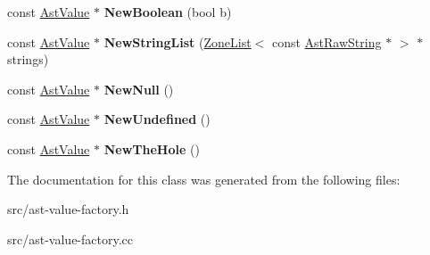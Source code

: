 \begin{DoxyCompactItemize}
\item 
\hypertarget{classv8_1_1internal_1_1_ast_value_factory_ae03a5d1347d22306588b0e5709ccfc82}{}const \hyperlink{classv8_1_1internal_1_1_ast_value}{Ast\+Value} $\ast$ {\bfseries New\+Boolean} (bool b)\label{classv8_1_1internal_1_1_ast_value_factory_ae03a5d1347d22306588b0e5709ccfc82}

\item 
\hypertarget{classv8_1_1internal_1_1_ast_value_factory_a7bee5a9a03b03f59d2a6c62ab52045ed}{}const \hyperlink{classv8_1_1internal_1_1_ast_value}{Ast\+Value} $\ast$ {\bfseries New\+String\+List} (\hyperlink{classv8_1_1internal_1_1_zone_list}{Zone\+List}$<$ const \hyperlink{classv8_1_1internal_1_1_ast_raw_string}{Ast\+Raw\+String} $\ast$ $>$ $\ast$strings)\label{classv8_1_1internal_1_1_ast_value_factory_a7bee5a9a03b03f59d2a6c62ab52045ed}

\item 
\hypertarget{classv8_1_1internal_1_1_ast_value_factory_a93026a40389b24fda775956f218248b8}{}const \hyperlink{classv8_1_1internal_1_1_ast_value}{Ast\+Value} $\ast$ {\bfseries New\+Null} ()\label{classv8_1_1internal_1_1_ast_value_factory_a93026a40389b24fda775956f218248b8}

\item 
\hypertarget{classv8_1_1internal_1_1_ast_value_factory_a8822771d32f8a55049f7698cc936b495}{}const \hyperlink{classv8_1_1internal_1_1_ast_value}{Ast\+Value} $\ast$ {\bfseries New\+Undefined} ()\label{classv8_1_1internal_1_1_ast_value_factory_a8822771d32f8a55049f7698cc936b495}

\item 
\hypertarget{classv8_1_1internal_1_1_ast_value_factory_acb9d0ab346a47b869034be56f9fda62d}{}const \hyperlink{classv8_1_1internal_1_1_ast_value}{Ast\+Value} $\ast$ {\bfseries New\+The\+Hole} ()\label{classv8_1_1internal_1_1_ast_value_factory_acb9d0ab346a47b869034be56f9fda62d}

\end{DoxyCompactItemize}


The documentation for this class was generated from the following files\+:\begin{DoxyCompactItemize}
\item 
src/ast-\/value-\/factory.\+h\item 
src/ast-\/value-\/factory.\+cc\end{DoxyCompactItemize}

